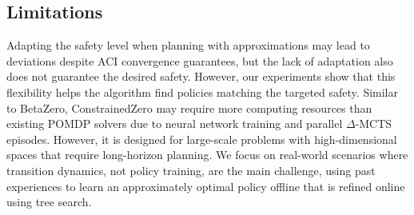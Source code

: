 \subsection{Limitations}
Adapting the safety level when planning with approximations may lead to deviations despite ACI convergence guarantees, but the lack of adaptation also does not guarantee the desired safety.
However, our experiments show that this flexibility helps the algorithm find policies matching the targeted safety.
Similar to BetaZero, ConstrainedZero may require more computing resources than existing POMDP solvers due to neural network training and parallel $\Delta$-MCTS episodes.
However, it is designed for large-scale problems with high-dimensional spaces that require long-horizon planning.
We focus on real-world scenarios where transition dynamics, not policy training, are the main challenge, using past experiences to learn an approximately optimal policy offline that is refined online using tree search.
